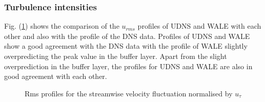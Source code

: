 \subsubsection{Turbulence intensities}
Fig. (\ref{urms udns vs wale}) shows the comparison of the $u_{rms}$ profiles of UDNS and WALE with each other  and also with the profile of the DNS data. Profiles of UDNS and WALE show a good agreement with the DNS data with the profile of WALE slightly overpredicting the peak value in the buffer layer. Apart from the slight overprediction in the buffer layer, the profiles for UDNS and WALE are also in good agreement with each other.
%
\begin{figure}[h!]
\begin{minipage}[b]{0.5\textwidth}
\end{minipage}
%
\begin{minipage}[b]{0.5\textwidth}
\end{minipage}
\caption{Rms profiles for the streamwise velocity fluctuation normalised by $u_\tau$}
\label{urms udns vs wale}
\end{figure} 
%

